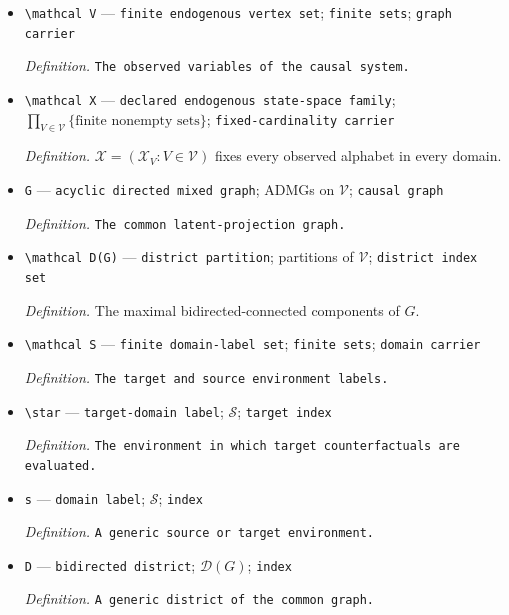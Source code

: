 \documentclass{article}
\begin{document}
\begin{itemize}
  \item \texttt{\textbackslash{}\allowbreak{}mathcal V} --- \texttt{finite endogenous vertex set}; \texttt{finite sets}; \texttt{graph carrier}
  \par\smallskip\noindent\emph{Definition.} \texttt{The observed variables of the causal system.}
  \item \texttt{\textbackslash{}\allowbreak{}mathcal X} --- \texttt{declared endogenous state-\allowbreak{}space family}; \(\prod_{V\in\mathcal V}\{\text{finite nonempty sets}\}\); \texttt{fixed-\allowbreak{}cardinality carrier}
  \par\smallskip\noindent\emph{Definition.} \(\mathcal X=(\mathcal X_V:V\in\mathcal V)\) fixes every observed alphabet in every domain.
  \item \texttt{G} --- \texttt{acyclic directed mixed graph}; ADMGs on \(\mathcal V\); \texttt{causal graph}
  \par\smallskip\noindent\emph{Definition.} \texttt{The common latent-\allowbreak{}projection graph.}
  \item \texttt{\textbackslash{}\allowbreak{}mathcal D(G)} --- \texttt{district partition}; partitions of \(\mathcal V\); \texttt{district index set}
  \par\smallskip\noindent\emph{Definition.} The maximal bidirected-connected components of \(G\).
  \item \texttt{\textbackslash{}\allowbreak{}mathcal S} --- \texttt{finite domain-\allowbreak{}label set}; \texttt{finite sets}; \texttt{domain carrier}
  \par\smallskip\noindent\emph{Definition.} \texttt{The target and source environment labels.}
  \item \texttt{\textbackslash{}\allowbreak{}star} --- \texttt{target-\allowbreak{}domain label}; \(\mathcal S\); \texttt{target index}
  \par\smallskip\noindent\emph{Definition.} \texttt{The environment in which target counterfactuals are evaluated.}
  \item \texttt{s} --- \texttt{domain label}; \(\mathcal S\); \texttt{index}
  \par\smallskip\noindent\emph{Definition.} \texttt{A generic source or target environment.}
  \item \texttt{D} --- \texttt{bidirected district}; \(\mathcal D(G)\); \texttt{index}
  \par\smallskip\noindent\emph{Definition.} \texttt{A generic district of the common graph.}

\end{itemize}
\end{document}
